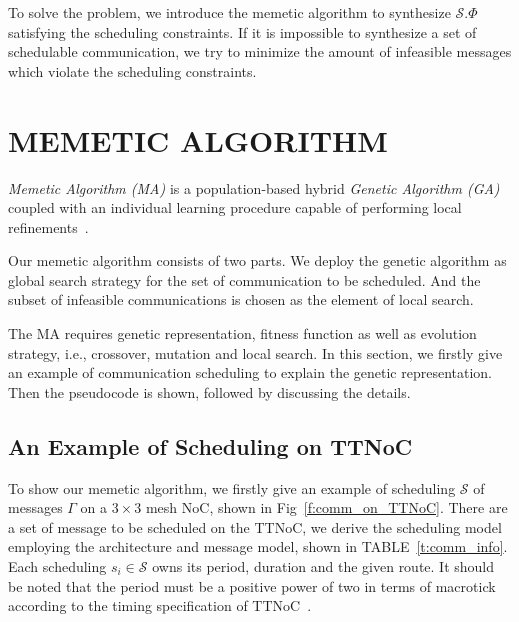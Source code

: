 \documentclass[journal]{IEEEtran}
\newcommand{\calS}{\mathcal{S}}
\theoremstyle{remark}
\begin{document}
To solve the problem, we introduce the memetic algorithm to synthesize
$\calS.\Phi$ satisfying the scheduling constraints. If it is
impossible to synthesize a set of schedulable communication, we try to
minimize the amount of infeasible messages which violate the
scheduling constraints.



\section{MEMETIC ALGORITHM\label{s:algorithm}}
\emph{Memetic Algorithm (MA)} is a population-based hybrid
\emph{Genetic Algorithm (GA)} coupled with an individual learning
procedure capable of performing local
refinements~\cite{DBLP:journals/cim/OngLC10}.

Our memetic algorithm consists of two parts. We deploy the genetic
algorithm as global search strategy for the set of communication to be
scheduled. And the subset of infeasible communications is chosen as
the element of local search.

The MA requires genetic representation, fitness function as well as
evolution strategy, i.e., crossover, mutation and local search. In
this section, we firstly give an example of communication scheduling
to explain the genetic representation. Then the pseudocode is shown,
followed by discussing the details.

  \subsection{An Example of Scheduling on TTNoC}
To show our memetic algorithm,
 we firstly give an example of scheduling $\calS$ of messages $\Gamma$ on a $3\times 3$ mesh NoC,
 shown in Fig~\ref{f:comm_on_TTNoC}. 
There are a set of message to be scheduled on the TTNoC,
 we derive the scheduling model employing the architecture and message model,
 shown in TABLE~\ref{t:comm_info}.
Each scheduling $s_i\in\calS$ owns its period, duration and the given route.
It should be noted that the period must be a positive power of two in terms of macrotick according to the timing specification of TTNoC~\cite{DBLP:conf/date/HuangBRBK12}.
\end{document}
